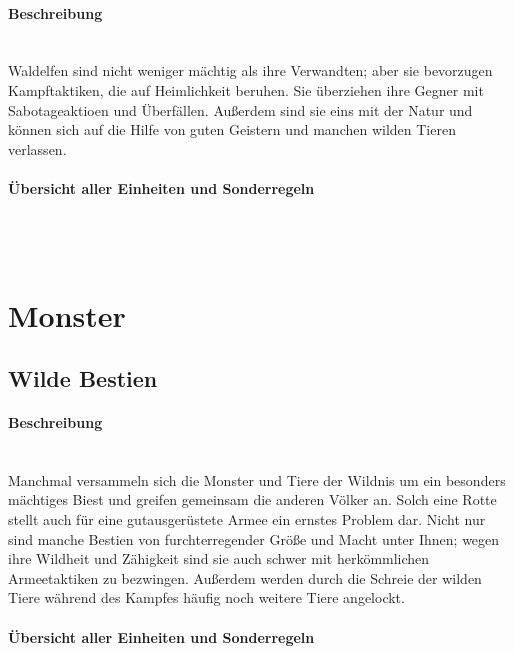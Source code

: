 \documentclass[a4paper,11pt]{report}
\begin{document}
\paragraph{Beschreibung}~\\
Waldelfen sind nicht weniger mächtig als ihre Verwandten; aber sie bevorzugen Kampftaktiken, die auf Heimlichkeit beruhen. Sie überziehen ihre Gegner mit Sabotageaktioen und Überfällen. Außerdem sind sie eins mit der Natur und können sich auf die Hilfe von guten Geistern und manchen wilden Tieren verlassen.

\paragraph{Übersicht aller Einheiten und Sonderregeln}~\\
%
\\


\section{Monster}
\subsection{Wilde Bestien}
\paragraph{Beschreibung}~\\
Manchmal versammeln sich die Monster und Tiere der Wildnis um ein besonders mächtiges Biest und greifen gemeinsam die anderen Völker an. Solch eine Rotte stellt auch für eine gutausgerüstete Armee ein ernstes Problem dar. Nicht nur sind manche Bestien von furchterregender Größe und Macht unter Ihnen; wegen ihre Wildheit und Zähigkeit sind sie auch schwer mit herkömmlichen Armeetaktiken zu bezwingen. Außerdem werden durch die Schreie der wilden Tiere während des Kampfes häufig noch weitere Tiere angelockt.

\paragraph{Übersicht aller Einheiten und Sonderregeln}~\\
\\

\end{document}
